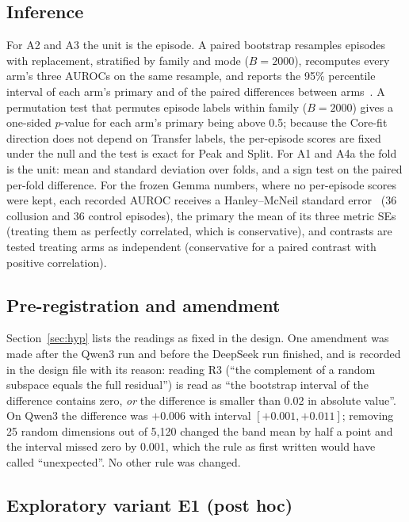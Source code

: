 \documentclass[11pt,a4paper]{article}
\begin{document}
\subsection{Inference}
\label{sec:inference}

For A2 and A3 the unit is the episode. A paired bootstrap resamples episodes with replacement, stratified by family and mode ($B=2000$), recomputes every arm's three AUROCs on the same resample, and reports the 95\% percentile interval of each arm's primary and of the paired differences between arms~\citep{efron1993bootstrap}. A permutation test that permutes episode labels within family ($B=2000$) gives a one-sided $p$-value for each arm's primary being above 0.5; because the Core-fit direction does not depend on Transfer labels, the per-episode scores are fixed under the null and the test is exact for Peak and Split. For A1 and A4a the fold is the unit: mean and standard deviation over folds, and a sign test on the paired per-fold difference. For the frozen Gemma numbers, where no per-episode scores were kept, each recorded AUROC receives a Hanley--McNeil standard error~\citep{hanley1982meaning} (36 collusion and 36 control episodes), the primary the mean of its three metric SEs (treating them as perfectly correlated, which is conservative), and contrasts are tested treating arms as independent (conservative for a paired contrast with positive correlation).

\subsection{Pre-registration and amendment}
\label{sec:prereg}

Section~\ref{sec:hyp} lists the readings as fixed in the design. One amendment was made after the Qwen3 run and before the DeepSeek run finished, and is recorded in the design file with its reason: reading R3 (``the complement of a random subspace equals the full residual'') is read as ``the bootstrap interval of the difference contains zero, \emph{or} the difference is smaller than 0.02 in absolute value''. On Qwen3 the difference was $+0.006$ with interval $[+0.001,+0.011]$; removing 25 random dimensions out of 5,120 changed the band mean by half a point and the interval missed zero by 0.001, which the rule as first written would have called ``unexpected''. No other rule was changed.

\subsection{Exploratory variant E1 (post hoc)}
\end{document}
